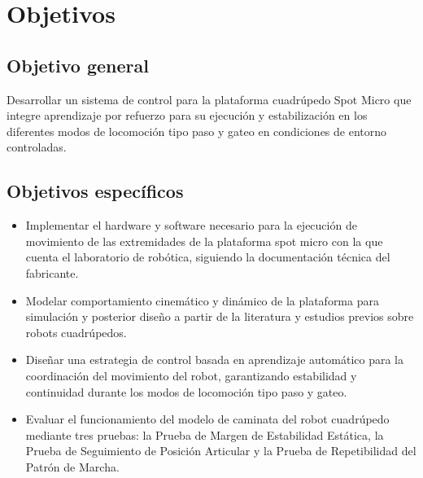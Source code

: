 \chapter{Objetivos}

\section{Objetivo general}

Desarrollar un sistema de control para la plataforma cuadrúpedo Spot Micro que integre aprendizaje por refuerzo para su ejecución y estabilización en los diferentes modos de locomoción tipo paso y gateo en condiciones de entorno controladas.

\section{Objetivos específicos}

\begin{itemize}

\item Implementar el hardware y software necesario para la ejecución de movimiento de las extremidades de la plataforma spot micro con la que cuenta el laboratorio de robótica, siguiendo la documentación técnica del fabricante.

\item Modelar comportamiento cinemático y dinámico de la plataforma para simulación y posterior diseño a partir de la literatura y estudios previos sobre robots cuadrúpedos.

\item Diseñar una estrategia de control basada en aprendizaje automático para la coordinación del movimiento del robot, garantizando estabilidad y continuidad durante los modos de locomoción tipo paso y gateo.

\item Evaluar el funcionamiento del modelo de caminata del robot cuadrúpedo mediante tres pruebas: la Prueba de Margen de Estabilidad Estática, la Prueba de Seguimiento de Posición Articular y la Prueba de Repetibilidad del Patrón de Marcha.

\end{itemize}

